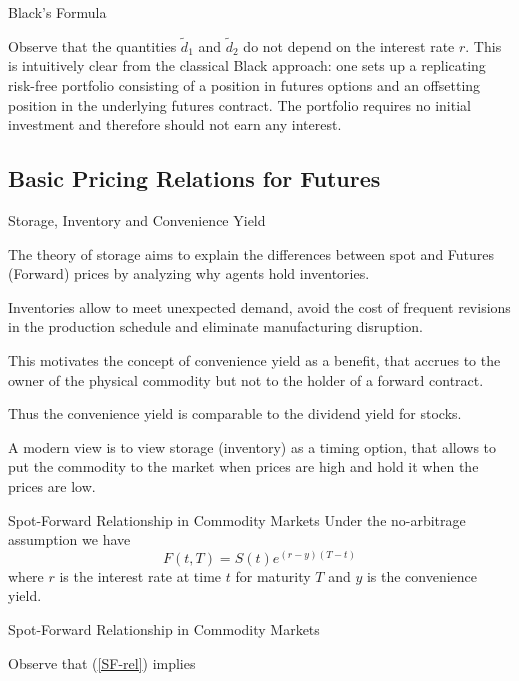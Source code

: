 {%
{Black's Formula}

Observe that the quantities $\tilde{d}_1$ and $\tilde{d}_2$ do not depend on the
interest rate $r$. This is intuitively clear from the classical
Black approach: one sets up a replicating risk-free portfolio
consisting of a position in futures options and an offsetting
position in the underlying futures contract. The portfolio
requires no initial investment and therefore should not earn any
interest.

\subsection{Basic Pricing Relations for Futures}

{Storage, Inventory and Convenience Yield}






	The theory of storage aims to explain the differences between spot
and Futures (Forward) prices by analyzing why agents hold inventories.

	Inventories
allow to meet unexpected demand, avoid the cost of frequent revisions in
the production schedule and eliminate manufacturing disruption.

	This
motivates the concept of convenience yield as a benefit, that accrues to the
owner of the physical commodity but not to the holder of a forward contract.

	Thus the convenience yield is comparable to the dividend yield for stocks.

	A modern view is to view storage (inventory) as a timing option, that
allows to put the commodity to the market when prices are high
and hold it when the prices are low.






{Spot-Forward Relationship in Commodity Markets }
Under the no-arbitrage assumption we have
\begin{equation}\label{SF-rel}
F(t,T)=S(t)e^{(r-y)(T-t)}
\end{equation}
where $r$ is the interest rate at time $t$ for maturity $T$ and $y$ is the convenience yield.

{Spot-Forward Relationship in Commodity Markets }

Observe that (\ref{SF-rel}) implies



}
